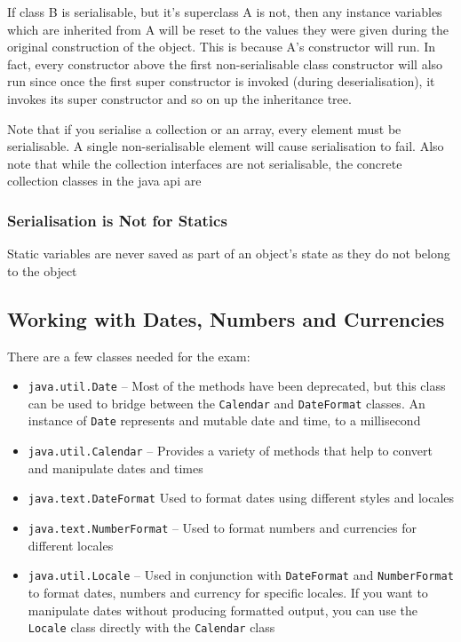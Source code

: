 If class B is serialisable, but it's superclass A is not, then any instance 
variables which are inherited from A will be reset to the values they were 
given during the original construction of the object. This is because A's 
constructor will run. In fact, every constructor above the first 
non-serialisable class constructor will also run since once the first super 
constructor is invoked (during deserialisation), it invokes its super 
constructor and so on up the inheritance tree.

Note that if you serialise a collection or an array, every element must be 
serialisable. A single non-serialisable element will cause serialisation to 
fail. Also note that while the collection interfaces are not serialisable, the 
concrete collection classes in the java api are

\subsubsection{Serialisation is Not for Statics}
Static variables are never saved as part of an object's state as they do not 
belong to the object

\subsection{Working with Dates, Numbers and Currencies}
There are a few classes needed for the exam:
\begin{itemize}
    \item \verb#java.util.Date# -- Most of the methods have been deprecated, 
    but this class can be used to bridge between the \verb#Calendar# and 
    \verb#DateFormat# classes. An instance of \verb#Date# represents and 
    mutable
    date and time, to a millisecond
    \item \verb#java.util.Calendar# -- Provides a variety of methods that help 
    to convert and manipulate dates and times
    \item \verb#java.text.DateFormat# Used to format dates using different 
    styles and locales
    \item \verb#java.text.NumberFormat# -- Used to format numbers and 
    currencies for different locales
    \item \verb#java.util.Locale# -- Used in conjunction with \verb#DateFormat# 
    and \verb#NumberFormat# to format dates, numbers and currency for specific 
    locales. If you want to manipulate dates without producing formatted 
    output, you can use the \verb#Locale# class directly with the 
    \verb#Calendar# class
\end{itemize}


